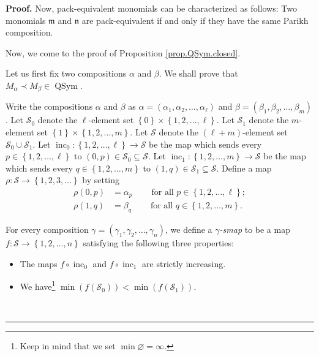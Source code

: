\documentclass[numbers=enddot,12pt,final,onecolumn,notitlepage,abstracton]{scrartcl}%
\theoremstyle{definition}
\newenvironment{proof}[1][Proof]{\noindent\textbf{#1.} }{\ \rule{0.5em}{0.5em}}
\begin{document}
\begin{proof}
Now, pack-equivalent monomials can be characterized as follows: Two monomials
$\mathfrak{m}$ and $\mathfrak{n}$ are pack-equivalent if and only if they have
the same Parikh composition.

Now, we come to the proof of Proposition \ref{prop.QSym.closed}.

Let us first fix two compositions $\alpha$ and $\beta$. We shall prove that
$M_{\alpha}\left.  \prec\right.  M_{\beta}\in\operatorname*{QSym}$.

Write the compositions $\alpha$ and $\beta$ as $\alpha=\left(  \alpha
_{1},\alpha_{2},\ldots,\alpha_{\ell}\right)  $ and $\beta=\left(  \beta
_{1},\beta_{2},\ldots,\beta_{m}\right)  $. Let $\mathcal{S}_{0}$ denote the
$\ell$-element set $\left\{  0\right\}  \times\left\{  1,2,\ldots
,\ell\right\}  $. Let $\mathcal{S}_{1}$ denote the $m$-element set $\left\{
1\right\}  \times\left\{  1,2,\ldots,m\right\}  $. Let $\mathcal{S}$ denote
the $\left(  \ell+m\right)  $-element set $\mathcal{S}_{0}\cup\mathcal{S}_{1}%
$. Let $\operatorname*{inc}\nolimits_{0}:\left\{  1,2,\ldots,\ell\right\}
\rightarrow\mathcal{S}$ be the map which sends every $p\in\left\{
1,2,\ldots,\ell\right\}  $ to $\left(  0,p\right)  \in\mathcal{S}_{0}%
\subseteq\mathcal{S}$. Let $\operatorname*{inc}\nolimits_{1}:\left\{
1,2,\ldots,m\right\}  \rightarrow\mathcal{S}$ be the map which sends every
$q\in\left\{  1,2,\ldots,m\right\}  $ to $\left(  1,q\right)  \in
\mathcal{S}_{1}\subseteq\mathcal{S}$. Define a map $\rho:\mathcal{S}%
\rightarrow\left\{  1,2,3,\ldots\right\}  $ by setting%
\begin{align*}
\rho\left(  0,p\right)   &  =\alpha_{p}\ \ \ \ \ \ \ \ \ \ \text{for all }%
p\in\left\{  1,2,\ldots,\ell\right\}  ;\\
\rho\left(  1,q\right)   &  =\beta_{q}\ \ \ \ \ \ \ \ \ \ \text{for all }%
q\in\left\{  1,2,\ldots,m\right\}  .
\end{align*}


For every composition $\gamma=\left(  \gamma_{1},\gamma_{2},\ldots,\gamma
_{n}\right)  $, we define a $\gamma$\textit{-smap} to be a map $f:\mathcal{S}%
\rightarrow\left\{  1,2,\ldots,n\right\}  $ satisfying the following three properties:

\begin{itemize}
\item The maps $f\circ\operatorname*{inc}\nolimits_{0}$ and $f\circ
\operatorname*{inc}\nolimits_{1}$ are strictly increasing.

\item We have\footnote{Keep in mind that we set $\min\varnothing=\infty$.}
$\min\left(  f\left(  \mathcal{S}_{0}\right)  \right)  <\min\left(  f\left(
\mathcal{S}_{1}\right)  \right)  $.


\end{itemize}
\end{proof}
\end{document}
